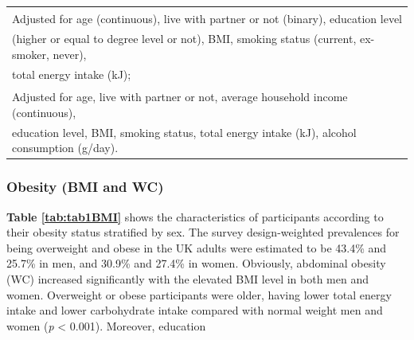 \begin{table}[H]
\begin{tabular}[t]{lccccc}
		\multicolumn{6}{l}{{\scriptsize \textsuperscript{\dag} Adjusted for age (continuous), live with partner or not (binary), education level}}\\ 
		\multicolumn{6}{l}{{\scriptsize (higher or equal to degree level or not), BMI, smoking status (current, ex-smoker, never),}}\\
		\multicolumn{6}{l}{{\scriptsize total energy intake (kJ);}}\\
		\multicolumn{6}{l}{{\scriptsize \textsuperscript{\ddag} Adjusted for age, live with partner or not, average household income (continuous),}}\\ 
		\multicolumn{6}{l}{{\scriptsize education level, BMI, smoking status, total energy intake (kJ), alcohol consumption (g/day).}}\\
	\end{tabular}
\end{table}
\vspace{-0.5cm}


\subsubsection{Obesity (BMI and WC)}\vspace{-0.3cm}

\textbf{Table \ref{tab:tab1BMI}} shows the characteristics of participants according to their obesity status stratified by sex. The survey design-weighted prevalences for being overweight and obese in the UK adults were estimated to be 43.4\% and 25.7\% in men, and 30.9\% and 27.4\% in women. Obviously, abdominal obesity (WC) increased significantly with the elevated BMI level in both men and women. Overweight or obese participants were older, having lower total energy intake and lower carbohydrate intake compared with normal weight men and women (\textit{p} < 0.001). Moreover, education


